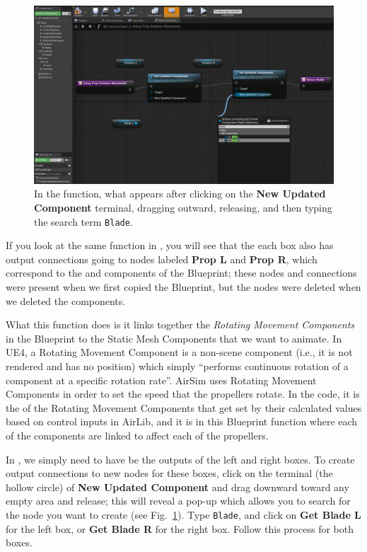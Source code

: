 \begin{figure}[ht]
    \centering
    \includegraphics[width=\textwidth]{figures/ue4_blueprint_setupproprotation2}
    \caption[Editing the Blueprint function SetupPropRotationMovement]{
        In the  function, what appears after clicking on the \textbf{New Updated Component} terminal, dragging outward, releasing, and then typing the search term \texttt{Blade}.}%
    \label{fig:ue4_blueprint_setupproprotation}
\end{figure}

If you look at the same function in , you will see that the each box also has output connections going to nodes labeled \textbf{Prop L} and \textbf{Prop R}, which correspond to the  and  components of the Blueprint; these nodes and connections were present when we first copied the  Blueprint, but the nodes were deleted when we deleted the  components.

What this function does is it links together the \textit{Rotating Movement Components} in the Blueprint to the Static Mesh Components that we want to animate. In UE4, a Rotating Movement Component is a non-scene component (i.e., it is not rendered and has no position) which simply ``performs continuous rotation of a component at a specific rotation rate''. AirSim uses Rotating Movement Components in order to set the speed that the propellers rotate. In the \CC code, it is the  of the Rotating Movement Components that get set by their calculated values based on control inputs in AirLib, and it is in this Blueprint function where each of the  components are linked to affect each of the propellers.

In , we simply need to have  be the outputs of the left and right boxes. To create output connections to new nodes for these boxes, click on the terminal (the hollow circle) of \textbf{New Updated Component} and drag downward toward any empty area and release; this will reveal a pop-up which allows you to search for the node you want to create (see Fig.~\ref{fig:ue4_blueprint_setupproprotation}). Type \texttt{Blade}, and click on \textbf{Get Blade L} for the left box, or \textbf{Get Blade R} for the right box. Follow this process for both boxes.

